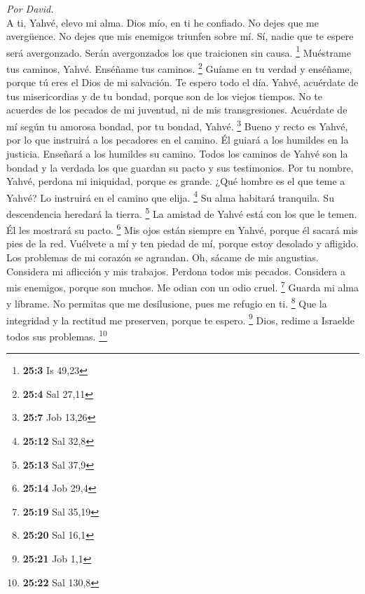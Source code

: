 \begin{paracol}{2}
\emph{Por David.}\\
 A ti, Yahvé, elevo mi alma.  Dios mío, en
ti he confiado. No dejes que me avergüence. No dejes que mis enemigos
triunfen sobre mí.  Sí, nadie que te espere será
avergonzado. Serán avergonzados los que traicionen sin causa.
\footnote{\textbf{25:3} Is 49,23}  Muéstrame tus caminos,
Yahvé. Enséñame tus caminos. \footnote{\textbf{25:4} Sal 27,11}
 Guíame en tu verdad y enséñame, porque tú eres el Dios de
mi salvación. Te espero todo el día.  Yahvé, acuérdate de
tus misericordias y de tu bondad, porque son de los viejos tiempos.
 No te acuerdes de los pecados de mi juventud, ni de mis
transgresiones. Acuérdate de mí según tu amorosa bondad, por tu bondad,
Yahvé. \footnote{\textbf{25:7} Job 13,26}  Bueno y recto
es Yahvé, por lo que instruirá a los pecadores en el camino.
 Él guiará a los humildes en la justicia. Enseñará a los
humildes su camino.  Todos los caminos de Yahvé son la
bondad y la verdada los que guardan su pacto y sus testimonios.
 Por tu nombre, Yahvé, perdona mi iniquidad, porque es
grande.  ¿Qué hombre es el que teme a Yahvé? Lo instruirá
en el camino que elija. \footnote{\textbf{25:12} Sal 32,8}
 Su alma habitará tranquila. Su descendencia heredará la
tierra. \footnote{\textbf{25:13} Sal 37,9}  La amistad de
Yahvé está con los que le temen. Él les mostrará su pacto. \footnote{\textbf{25:14}
  Job 29,4}  Mis ojos están siempre en Yahvé, porque él
sacará mis pies de la red.  Vuélvete a mí y ten piedad de
mí, porque estoy desolado y afligido.  Los problemas de
mi corazón se agrandan. Oh, sácame de mis angustias. 
Considera mi aflicción y mis trabajos. Perdona todos mis pecados.
 Considera a mis enemigos, porque son muchos. Me odian
con un odio cruel. \footnote{\textbf{25:19} Sal 35,19} 
Guarda mi alma y líbrame. No permitas que me desilusione, pues me
refugio en ti. \footnote{\textbf{25:20} Sal 16,1}  Que la
integridad y la rectitud me preserven, porque te espero. \footnote{\textbf{25:21}
  Job 1,1}  Dios, redime a Israelde todos sus problemas.
\footnote{\textbf{25:22} Sal 130,8}

\switchcolumn
\begin{otherlanguage}{english}

\hypertarget{section-49}{%
}
\end{otherlanguage}
\end{paracol}
